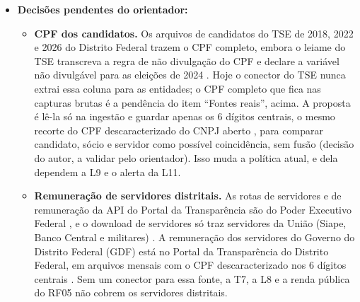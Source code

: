 \begin{itemize}
	valor informado pelo próprio candidato \cite{tse2026dadosabertos}. Só
	cobre quem foi candidato, e a comparação exige ao menos duas eleições.
	Nos arquivos do Distrito Federal, o mesmo título eleitoral aparece em 299
	pessoas entre 2018 e 2022 e em 206 entre 2022 e 2026 (contagem do autor
	nos arquivos do TSE). A declaração de bens do agente público fica
	arquivada no serviço de pessoal e não é aberta
	\cite[art. 13]{brasil1992lei8429}. Renda privada, herança e renda do
	cônjuge não aparecem. E a desproporção, sozinha, é indício: a lei exige
	que os bens decorram de vantagem indevida e assegura ao agente demonstrar
	a licitude da origem \cite[art. 9º, VII]{brasil1992lei8429}.
	\item \textbf{Decisões pendentes do orientador:}
	\begin{itemize}
		\item \textbf{CPF dos candidatos.} Os arquivos de candidatos do TSE
		de 2018, 2022 e 2026 do Distrito Federal trazem o CPF completo, embora
		o leiame do TSE transcreva a regra de não divulgação do CPF e declare a
		variável não divulgável para as eleições de 2024
		\cite{tse2026dadosabertos}. Hoje o conector do TSE nunca extrai essa
		coluna para as entidades; o CPF completo que fica nas capturas brutas é
		a pendência do item ``Fontes reais'', acima. A
		proposta é lê-la só na ingestão e guardar apenas os 6 dígitos
		centrais, o mesmo recorte do CPF descaracterizado do CNPJ aberto
		\cite{rfbcnpjmetadados}, para comparar candidato, sócio e servidor
		como possível coincidência, sem fusão (decisão do autor, a validar
		pelo orientador). Isso muda a política atual, e dela dependem a L9 e o
		alerta da L11.
		\item \textbf{Remuneração de servidores distritais.} As rotas de
		servidores e de remuneração da API do Portal da Transparência são do
		Poder Executivo Federal \cite{cguapiportal}, e o download de servidores
		só traz servidores da União (Siape, Banco Central e militares)
		\cite{cguportalservidores}. A remuneração dos servidores do Governo do
		Distrito Federal (GDF) está no Portal da Transparência do Distrito
		Federal, em arquivos mensais com o CPF descaracterizado nos 6 dígitos
		centrais \cite{dfportalremuneracao}. Sem um conector para essa fonte, a
		T7, a L8 e a renda pública do RF05 não cobrem os servidores
		distritais.
	\end{itemize}
\end{itemize}

\endgroup

